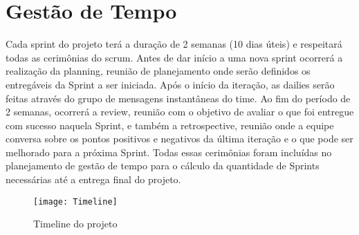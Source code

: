 \section{Gestão de Tempo}
Cada \gls{sprint} do projeto terá a duração de 2 semanas (10 dias úteis) e respeitará
todas as cerimônias do \gls{scrum}. Antes de dar início a uma nova sprint
ocorrerá a realização da \gls{planning}, reunião de planejamento onde
serão definidos os entregáveis da Sprint a ser iniciada. Após o início
da iteração, as dailies serão feitas através do grupo de mensagens
instantâneas do time. Ao fim do período de 2 semanas, ocorrerá a
\gls{review}, reunião com o objetivo de avaliar o que foi entregue
com sucesso naquela Sprint, e também a \gls{retrospective}, reunião
onde a equipe conversa sobre os pontos positivos e negativos da última
iteração e o que pode ser melhorado para a próxima Sprint. Todas essas
cerimônias foram incluídas no planejamento de gestão de tempo para o
cálculo da quantidade de Sprints necessárias até a entrega final do
projeto.

\begin{figure}[H]
  \centering
  \caption{Timeline do projeto}
  \label{fig:cli-srv}
  \texttt{[image: Timeline]}
\end{figure}

